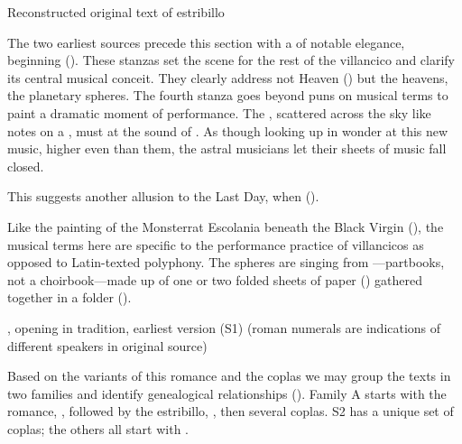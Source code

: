 \addtoindex{
    \GdP;
    \RoyalChapel
}

{Reconstructed original text of  estribillo}

The two earliest sources precede this section with a  of notable
elegance, beginning 
().
These stanzas set the scene for the rest of the villancico and clarify its
central musical conceit.
They clearly address not Heaven () but the heavens, the
planetary spheres.
The fourth stanza goes beyond puns on musical terms to paint a dramatic moment
of performance.
The , scattered across the sky like notes on a , must  at the sound of .
As though looking up in wonder at this new music, higher even than them, the
astral musicians let their sheets of music fall closed.%
\begin{Footnote}
    This suggests another allusion to the Last Day, when  ().
\end{Footnote}
Like the painting of the Monsterrat Escolania beneath the Black Virgin
(), the musical terms here are specific to the
performance practice of villancicos as opposed to Latin-texted polyphony.
The spheres are singing from ---partbooks, not a
choirbook---made up of one or two folded sheets of paper () gathered together in a folder ().


{, opening  in  tradition, earliest version (S1) (roman numerals are indications of
different speakers in original source)}

Based on the variants of this romance and the coplas we may group the
texts in two families and identify genealogical relationships
().
Family A starts with the romance, ,
followed by the estribillo, ,
then several coplas.
S2 has a unique set of coplas; the others all start with .

